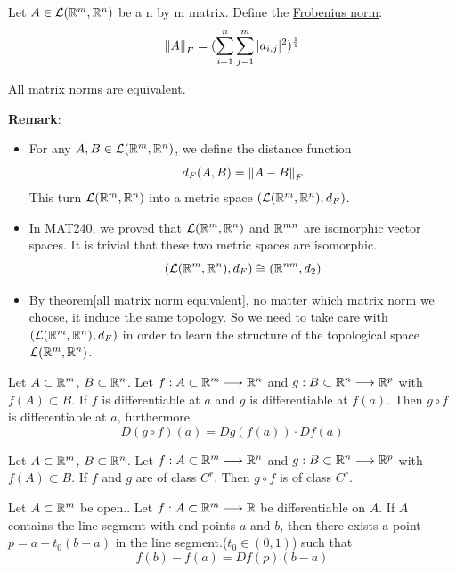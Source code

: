 \begin{definition}
    Let $A\in \mathcal{L}(\mathbb{R}^m,\mathbb{R}^n)$ be a n by m matrix. Define the \underline{ Frobenius norm}:
    $$\left\lVert A \right\rVert_F=(\sum_{i=1}^n \sum_{j=1}^m|a_{i,j}|^2)^{\frac{1}{1}}$$
\end{definition}

\begin{theorem*}\label{all matrix norm equivalent}
    All matrix norms are equivalent.
\end{theorem*}
\noindent \textbf{Remark}:
\begin{itemize}
    \item For any $A,B\in \mathcal{L}(\mathbb{R}^m,\mathbb{R}^n)$, we define the distance function
    $$d_F(A,B)=\left\lVert A-B \right\rVert_F$$
    This turn $\mathcal{L}(\mathbb{R}^m,\mathbb{R}^n)$ into a metric space $(\mathcal{L}(\mathbb{R}^m,\mathbb{R}^n),d_F)$.
    \item In MAT240, we proved that $\mathcal{L}(\mathbb{R}^m,\mathbb{R}^n)$ and $\mathbb{R}^{mn}$ are isomorphic vector spaces. It is trivial that these two metric spaces are isomorphic. $$(\mathcal{L}(\mathbb{R}^m,\mathbb{R}^n),d_F) \cong (\mathbb{R}^{nm},d_2)$$
    \item By theorem\ref{all matrix norm equivalent}, no matter which matrix norm we choose, it induce the same topology. So we need to take care with $(\mathcal{L}(\mathbb{R}^m,\mathbb{R}^n),d_F)$ in order to learn the structure of the topological space $\mathcal{L}(\mathbb{R}^m,\mathbb{R}^n)$.
\end{itemize}


\begin{theorem}\label{Chain Rule}
    Let $A\subset \mathbb{R}^m$, $B\subset \mathbb{R}^n$. Let $f:A\subset\mathbb{R}^m \longrightarrow \mathbb{R}^n$ and $g:B\subset\mathbb{R}^n \longrightarrow \mathbb{R}^p$ with $f(A)\subset B$.
    If $f$ is differentiable at $a$ and $g$ is differentiable at $f(a)$. Then $g \circ f$ is differentiable at $a$, furthermore $$D(g\circ f)(a)=Dg(f(a))\cdot Df(a)$$
\end{theorem}


\begin{corollary}\label{composition also in Cr}
    Let $A\subset \mathbb{R}^m$, $B\subset \mathbb{R}^n$. Let $f:A\subset\mathbb{R}^m \longrightarrow \mathbb{R}^n$ and $g:B\subset\mathbb{R}^n \longrightarrow \mathbb{R}^p$ with $f(A)\subset B$.
    If $f$ and $g$ are of class $C^r$. Then $g \circ f$ is of class $C^r$.
\end{corollary}

\begin{theorem}\label{MVTmultivariable}
    Let $A\subset \mathbb{R}^m$ be open..  Let $f:A\subset \mathbb{R}^m \longrightarrow \mathbb{R}$ be differentiable on $A$.
    If $A$ contains the line segment with end points $a$ and $b$, then there exists a point $p=a+t_0(b-a)$ in the line segment.($t_0\in(0,1)$) such that
    $$f(b)-f(a)=Df(p)(b-a)$$
\end{theorem}

